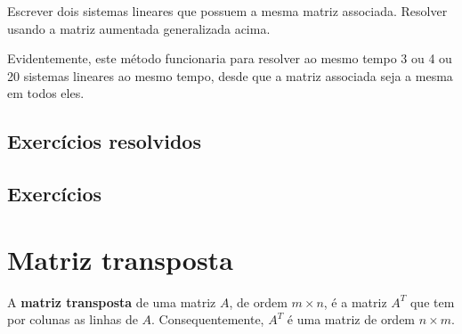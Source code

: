 \begin{exer}
	Escrever dois sistemas lineares que possuem a mesma matriz associada. Resolver usando a matriz aumentada generalizada acima.
\end{exer}

Evidentemente, este método funcionaria para resolver ao mesmo tempo 3 ou 4 ou 20 sistemas lineares ao mesmo tempo, desde que a matriz associada seja a mesma em todos eles.

\subsection*{Exercícios resolvidos}

\construirExeresol

\subsection*{Exercícios}

\construirExer


\section{Matriz transposta}


A \textbf{matriz transposta} de uma matriz $A$, de ordem $m\times n$, é a matriz $A^T$ que tem por colunas as linhas de $A$. Consequentemente, $A^T$ é uma matriz de ordem $n \times m$.

